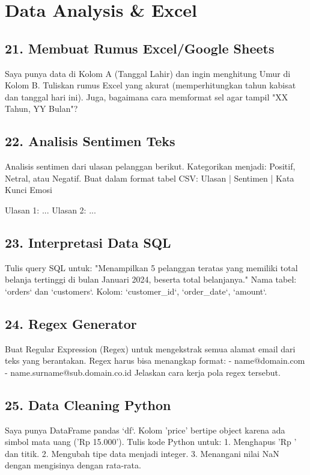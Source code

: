 \section{Data Analysis & Excel}

\subsection{21. Membuat Rumus Excel/Google Sheets}
\begin{promptbox}
Saya punya data di Kolom A (Tanggal Lahir) dan ingin menghitung Umur di Kolom B.
Tuliskan rumus Excel yang akurat (memperhitungkan tahun kabisat dan tanggal hari ini).
Juga, bagaimana cara memformat sel agar tampil "XX Tahun, YY Bulan"?
\end{promptbox}

\subsection{22. Analisis Sentimen Teks}
\begin{promptbox}
Analisis sentimen dari ulasan pelanggan berikut. Kategorikan menjadi: Positif, Netral, atau Negatif.
Buat dalam format tabel CSV:
Ulasan | Sentimen | Kata Kunci Emosi

Ulasan 1: ...
Ulasan 2: ...
\end{promptbox}

\subsection{23. Interpretasi Data SQL}
\begin{promptbox}
Tulis query SQL untuk:
"Menampilkan 5 pelanggan teratas yang memiliki total belanja tertinggi di bulan Januari 2024, beserta total belanjanya."
Nama tabel: `orders` dan `customers`.
Kolom: `customer_id`, `order_date`, `amount`.
\end{promptbox}

\subsection{24. Regex Generator}
\begin{promptbox}
Buat Regular Expression (Regex) untuk mengekstrak semua alamat email dari teks yang berantakan.
Regex harus bisa menangkap format:
- name@domain.com
- name.surname@sub.domain.co.id
Jelaskan cara kerja pola regex tersebut.
\end{promptbox}

\subsection{25. Data Cleaning Python}
\begin{promptbox}
Saya punya DataFrame pandas `df`. Kolom 'price' bertipe object karena ada simbol mata uang ('Rp 15.000').
Tulis kode Python untuk:
1. Menghapus 'Rp ' dan titik.
2. Mengubah tipe data menjadi integer.
3. Menangani nilai NaN dengan mengisinya dengan rata-rata.
\end{promptbox}

